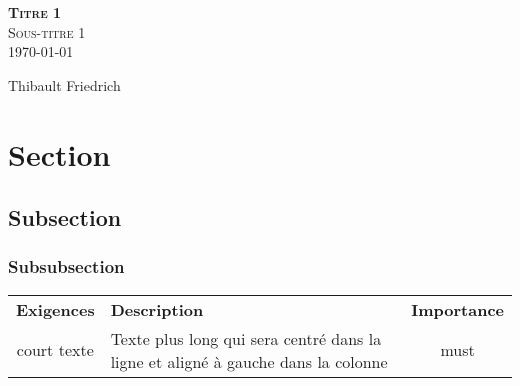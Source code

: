 \documentclass[11pt,a4paper]{report}
\newcommand{\simplesubject}{Titre 1}
\newcommand{\simpletitle}{Sous-titre 1}
\newcommand{\reporttitle}{\textbf{\simplesubject} \bigskip \\\simpletitle}
\newcommand{\reportdate}{\today}
\newcommand{\reportauthor}{Thibault Friedrich}
\newcommand{\must}{must}
\begin{document}
   

\begin{titlepage}
    \begin{center}


        \textsc{\Huge \color{bluesection} \reporttitle}\\[0.5cm]
       {\large \reportdate}\bigskip
        

       {\Large \color{bluesubsection} \reportauthor}



    \end{center}
\end{titlepage}

\renewcommand{\contentsname}{\color{bluesection} Table of contents}
\tableofcontents

\clearpage


\section{Section} %
\label{sec:section}

\subsection{Subsection} %
\label{sub:subsection}

\subsubsection{Subsubsection}

\begin{center}
\begin{tabular}{c|M{10cm}|c}
    \hline
    \textbf{Exigences} & \textbf{Description} & \textbf{Importance}\tabularnewline
    court texte & Texte plus long qui sera centré dans la ligne
    et aligné à gauche dans la colonne  & \must \tabularnewline
    \hline
\end{tabular}
\end{center}
\end{document}
